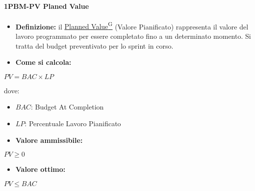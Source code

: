 \paragraph*{1PBM-PV Planed Value}
\begin{itemize}
    \item \textbf{Definizione:} il \href{https://code7crusaders.github.io/docs/PB/documentazione_interna/glossario.html#planned-value}{Planned Value\textsuperscript{G}} (Valore Pianificato) rappresenta il valore del lavoro programmato per essere completato fino a un determinato momento. Si tratta del budget preventivato per lo sprint in corso.
    \item \textbf{Come si calcola:}
\end{itemize}
\begin{center}
   $PV = BAC \times LP$ 
\end{center}
dove:
\begin{itemize}[label=$\rightarrow$]
    \item $BAC$: Budget At Completion
    \item $LP$: Percentuale Lavoro Pianificato
\end{itemize}
\begin{itemize}
    \item \textbf{Valore ammissibile:}
\end{itemize}
\begin{center}
    $PV \geq 0$
\end{center}
\begin{itemize}
    \item \textbf{Valore ottimo:}
\end{itemize}
\begin{center}
    $PV \leq BAC$
\end{center}

